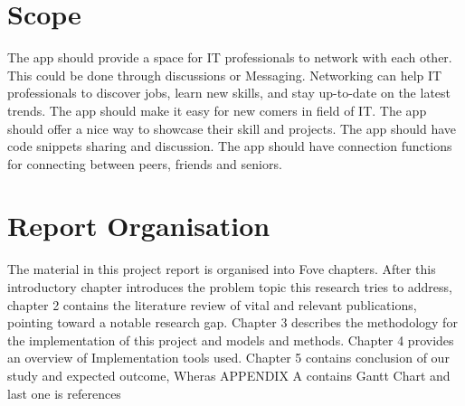 \section{Scope}

The app should provide a space for IT professionals to network with each other. This could be done through discussions or Messaging. Networking can help IT professionals to discover jobs, learn new skills, and stay up-to-date on the latest trends.
The app should make it easy for new comers in field of IT.
The app should offer a nice way to showcase their skill and projects.
The app should have code snippets sharing and discussion.
The app should have connection functions for connecting between peers, friends and seniors.
\section{Report Organisation}
The material in this project report is organised into Fove chapters. After this introductory chapter introduces the problem topic this research tries to address, chapter 2 contains the literature review of vital and relevant publications, pointing toward a notable research gap. Chapter 3 describes the methodology for the implementation of this project and models and methods. Chapter 4 provides an overview of Implementation tools used. Chapter 5 contains conclusion of our study and expected outcome, Wheras APPENDIX A contains Gantt Chart and last one is references